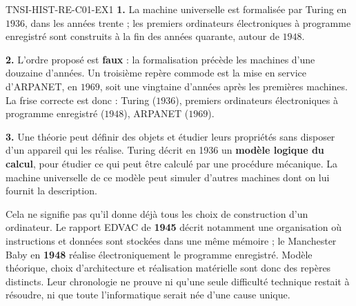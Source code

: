 \begin{corrige}{TNSI-HIST-RE-C01-EX1}
\textbf{1.} La machine universelle est formalisée par Turing en $1936$, dans les
années trente ; les premiers ordinateurs électroniques à programme enregistré sont construits à
la fin des années quarante, autour de $1948$.

\textbf{2.} L'ordre proposé est \textbf{faux} : la formalisation précède les
machines d'une douzaine d'années. Un troisième repère commode est la mise en
service d'ARPANET, en $1969$, soit une vingtaine d'années après les premières
machines. La frise correcte est donc : Turing ($1936$), premiers ordinateurs électroniques à
programme enregistré ($1948$), ARPANET ($1969$).

\textbf{3.} Une théorie peut définir des objets et étudier leurs propriétés sans disposer d'un appareil qui les réalise. Turing décrit en 1936 un \textbf{modèle logique du calcul}, pour étudier ce qui peut être calculé par une procédure mécanique. La machine universelle de ce modèle peut simuler d'autres machines dont on lui fournit la description.

Cela ne signifie pas qu'il donne déjà tous les choix de construction d'un ordinateur. Le rapport EDVAC de \textbf{1945} décrit notamment une organisation où instructions et données sont stockées dans une même mémoire ; le Manchester Baby en \textbf{1948} réalise électroniquement le programme enregistré. Modèle théorique, choix d'architecture et réalisation matérielle sont donc des repères distincts. Leur chronologie ne prouve ni qu'une seule difficulté technique restait à résoudre, ni que toute l'informatique serait née d'une cause unique.
\end{corrige}
